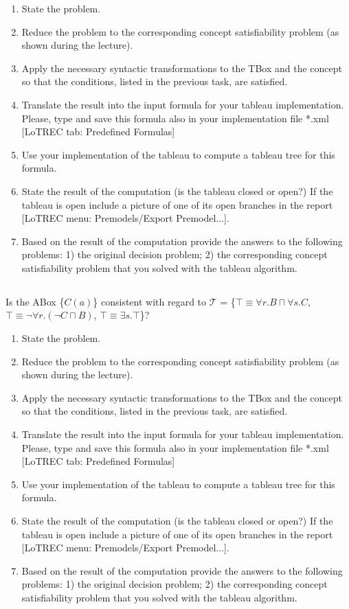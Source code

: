 \documentclass[11pt]{article} %
\begin{document}
\begin{enumerate}
\item State the problem.
\item Reduce the problem to the corresponding concept satisfiability problem (as shown during the lecture).
\item Apply the necessary syntactic transformations to the TBox and the concept so that the conditions, listed in the previous task, are satisfied.
\item Translate the result into the input formula for your tableau implementation. Please, type and save this formula also in your implementation file *.xml [LoTREC tab: Predefined Formulas]
\item Use your implementation of the tableau to compute a tableau tree for this formula.
\item State the result of the computation (is the tableau closed or open?) If the tableau is open include a picture of one of its open branches in the report [LoTREC menu: Premodels/Export Premodel...].
\item Based on the result of the computation provide the answers to the following problems: 1) the original decision problem; 2) the corresponding concept satisfiability problem that you solved with the tableau algorithm.
\end{enumerate}

\subsection{}

\begin{center}
Is the ABox \{$C(a)$\} consistent with regard to $\mathcal{T}$ = \{$\top \equiv \forall r.B \sqcap \forall s.C$, $\top \equiv \neg \forall r.(\neg C \sqcap B)$, $\top \equiv \exists s.\top$\}?
\end{center}

\begin{enumerate}
\item State the problem.
\item Reduce the problem to the corresponding concept satisfiability problem (as shown during the lecture).
\item Apply the necessary syntactic transformations to the TBox and the concept so that the conditions, listed in the previous task, are satisfied.
\item Translate the result into the input formula for your tableau implementation. Please, type and save this formula also in your implementation file *.xml [LoTREC tab: Predefined Formulas]
\item Use your implementation of the tableau to compute a tableau tree for this formula.
\item State the result of the computation (is the tableau closed or open?) If the tableau is open include a picture of one of its open branches in the report [LoTREC menu: Premodels/Export Premodel...].
\item Based on the result of the computation provide the answers to the following problems: 1) the original decision problem; 2) the corresponding concept satisfiability problem that you solved with the tableau algorithm.
\end{enumerate}
\end{document}
